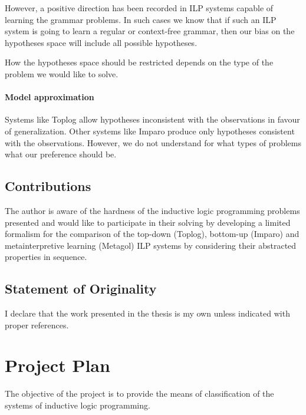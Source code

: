However, a positive direction has been recorded in ILP systems capable of learning the grammar problems. In such cases we know that if such an ILP system is going to learn a regular or context-free grammar, then our bias on the hypotheses space will include all possible hypotheses.

How the hypotheses space should be restricted depends on the type of the problem we would like to solve.

\subsubsection{Model approximation}
Systems like Toplog allow hypotheses inconsistent with the observations in favour of generalization. Other systems like Imparo produce only hypotheses consistent with the observations. However, we do not understand for what types of problems what our preference should be.


\section{Contributions}
The author is aware of the hardness of the inductive logic programming problems presented and would like to participate in their solving by developing a limited formalism for the comparison of the top-down (Toplog), bottom-up (Imparo) and metainterpretive learning (Metagol) ILP systems by considering their abstracted properties in sequence.


\section{Statement of Originality}

I declare that the work presented in the thesis is my own unless indicated with proper references.

\chapter{Project Plan}
The objective of the project is to provide the means of classification of the systems of inductive logic programming.

